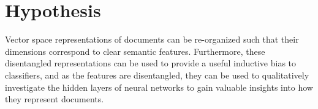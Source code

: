 









\section{Hypothesis}



Vector space representations of documents can be re-organized  such that their dimensions correspond to clear semantic features. Furthermore, these disentangled representations can be used to provide a useful inductive bias to classifiers, and as the features are disentangled, they can be used to qualitatively investigate the hidden layers of neural networks to gain valuable insights into how they represent documents. 

